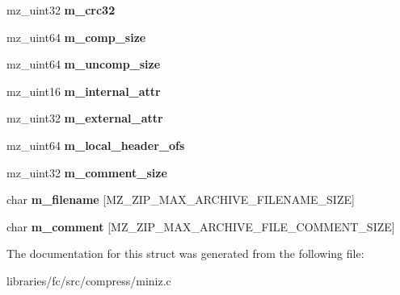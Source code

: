 \begin{DoxyCompactItemize}
mz\+\_\+uint32 {\bfseries m\+\_\+crc32}
\item 
\mbox{\label{structmz__zip__archive__file__stat_ae2ac087fa11585219308de1677000ab3}} 
mz\+\_\+uint64 {\bfseries m\+\_\+comp\+\_\+size}
\item 
\mbox{\label{structmz__zip__archive__file__stat_aa55ee3580a844400d4bd43be27ae3808}} 
mz\+\_\+uint64 {\bfseries m\+\_\+uncomp\+\_\+size}
\item 
\mbox{\label{structmz__zip__archive__file__stat_ad628219b167bef01305e8fa09a1f10d1}} 
mz\+\_\+uint16 {\bfseries m\+\_\+internal\+\_\+attr}
\item 
\mbox{\label{structmz__zip__archive__file__stat_a0303a6779c89c31eecf62b4744913272}} 
mz\+\_\+uint32 {\bfseries m\+\_\+external\+\_\+attr}
\item 
\mbox{\label{structmz__zip__archive__file__stat_acc27b6ca5dd7159c19bc3dc32e844ac7}} 
mz\+\_\+uint64 {\bfseries m\+\_\+local\+\_\+header\+\_\+ofs}
\item 
\mbox{\label{structmz__zip__archive__file__stat_aacf4d95d27894acac1303f51542c51b6}} 
mz\+\_\+uint32 {\bfseries m\+\_\+comment\+\_\+size}
\item 
\mbox{\label{structmz__zip__archive__file__stat_ae500a60c1ca2d56199fa06f54036abea}} 
char {\bfseries m\+\_\+filename} \mbox{[}M\+Z\+\_\+\+Z\+I\+P\+\_\+\+M\+A\+X\+\_\+\+A\+R\+C\+H\+I\+V\+E\+\_\+\+F\+I\+L\+E\+N\+A\+M\+E\+\_\+\+S\+I\+ZE\mbox{]}
\item 
\mbox{\label{structmz__zip__archive__file__stat_afb0f2b80d59f134f6fee4c8728649119}} 
char {\bfseries m\+\_\+comment} \mbox{[}M\+Z\+\_\+\+Z\+I\+P\+\_\+\+M\+A\+X\+\_\+\+A\+R\+C\+H\+I\+V\+E\+\_\+\+F\+I\+L\+E\+\_\+\+C\+O\+M\+M\+E\+N\+T\+\_\+\+S\+I\+ZE\mbox{]}
\end{DoxyCompactItemize}


The documentation for this struct was generated from the following file\+:\begin{DoxyCompactItemize}
\item 
libraries/fc/src/compress/miniz.\+c\end{DoxyCompactItemize}

